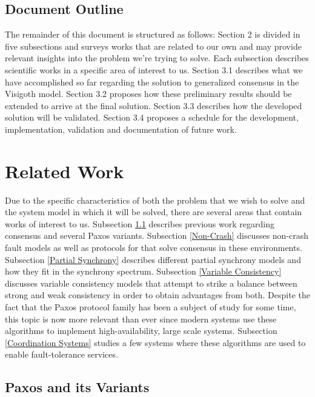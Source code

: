 \documentclass[runningheads,a4paper]{llncs}
\begin{document}
\subsection{Document Outline}

The remainder of this document is structured as follows: Section 2 is divided in five subsections and surveys works that are related to our own and may provide relevant insights into the problem we're trying to solve. Each subsection describes scientific works in a specific area of interest to us. Section 3.1 describes what we have accomplished so far regarding the solution to generalized consensus in the Visigoth model. Section 3.2 proposes how these preliminary results should be extended to arrive at the final solution. Section 3.3 describes how the developed solution will be validated. Section 3.4 proposes a schedule for the development, implementation, validation and documentation of future work.

\section{Related Work} \label{Related Work}

Due to the specific characteristics of both the problem that we wish to solve and the system model in which it will be solved, there are several areas that contain works of interest to us. Subsection \ref{Paxos} describes previous work regarding consensus and several Paxos variants. Subsection \ref{Non-Crash} discusses non-crash fault models as well as protocols for that solve consensus in these environments. Subsection \ref{Partial Synchrony} describes different partial synchrony models and how they fit in the synchrony spectrum. Subsection \ref{Variable Consistency} discusses variable consistency models that attempt to strike a balance between strong and weak consistency in order to obtain advantages from both. Despite the fact that the Paxos protocol family has been a subject of study for some time, this topic is now more relevant than ever since modern systems use these algorithms to implement high-availability, large scale systems. Subsection \ref{Coordination Systems} studies a few systems where these algorithms are used to enable fault-tolerance services.

\subsection{Paxos and its Variants} \label{Paxos} 
\end{document}
